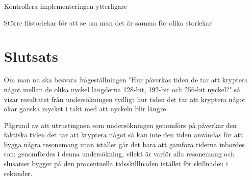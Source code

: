 Kontrollera implementeringen ytterligare

Större filstorlekar för att se om man det är samma för olika storlekar

\section{Slutsats} %
\label{sec:conclusion}
Om man nu ska besvara frågeställningen "Hur påverkas tiden de tar att kryptera något mellan de olika nyckel längderna 128-bit, 192-bit och 256-bit nyckel?" så visar resultatet från
undersökningen tydligt hur tiden det tar att kryptera något ökar ganska mycket i takt med att nyckeln blir längre.

Pågrund av att utrustingnen som undersökningen genomförs på påverkar den faktiska tiden det tar att kryptera något så kan inte den tiden användas för att bygga några resonemang
utan istället går det bara att gämföra tiderna inbördes som genomfördes i denna undersökning, vilekt är varför alla resonemang och slusatser bygger på den procentuella tidsskilllnaden istället för
skillnaden i sekunder.